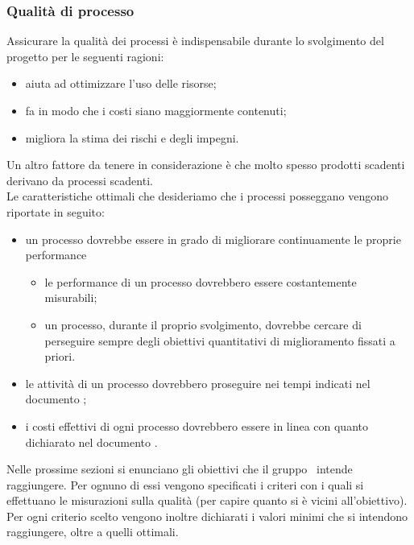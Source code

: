 \documentclass[../PianoDiQualifica.tex]{subfiles}
\begin{document}
		\subsubsection{Qualità di processo}
		Assicurare la qualità dei processi è indispensabile durante lo svolgimento del progetto per le seguenti ragioni:
		\begin{itemize}
		\item aiuta ad ottimizzare l'uso delle risorse;
		\item fa in modo che i costi siano maggiormente contenuti;
		\item migliora la stima dei rischi e degli impegni.
		\end{itemize}
		Un altro fattore da tenere in considerazione è che molto spesso prodotti scadenti derivano da processi scadenti.\\
		Le caratteristiche ottimali che desideriamo che i processi posseggano vengono riportate in seguito:
		\begin{itemize}
			\item un processo dovrebbe essere in grado di migliorare continuamente le proprie performance
			\begin{itemize}
				\item le performance di un processo dovrebbero essere costantemente misurabili;
				\item un processo, durante il proprio svolgimento, dovrebbe cercare di perseguire sempre degli obiettivi quantitativi di miglioramento fissati a priori.
			\end{itemize}
			\item le attività di un processo dovrebbero proseguire nei tempi indicati nel documento \pianodiprogettov;
			\item i costi effettivi di ogni processo dovrebbero essere in linea con quanto dichiarato nel documento \pianodiprogettov.
		\end{itemize}
		Nelle prossime sezioni si enunciano gli obiettivi che il gruppo \leaf\ intende raggiungere. Per ognuno di essi vengono specificati i criteri con i quali si effettuano le misurazioni sulla qualità (per capire quanto si è vicini all’obiettivo).\\
		Per ogni criterio scelto vengono inoltre dichiarati i valori minimi che si intendono raggiungere, oltre a quelli ottimali.
			
\end{document}
